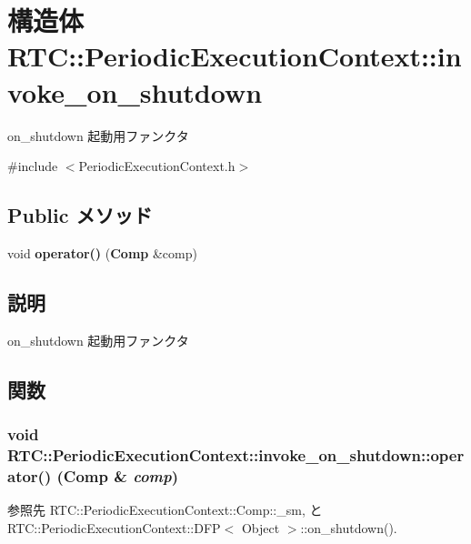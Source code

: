 \section{構造体 RTC::PeriodicExecutionContext::invoke\_\-on\_\-shutdown}
\label{structRTC_1_1PeriodicExecutionContext_1_1invoke__on__shutdown}


on\_\-shutdown 起動用ファンクタ  




{\ttfamily \#include $<$PeriodicExecutionContext.h$>$}

\subsection*{Public メソッド}
\begin{DoxyCompactItemize}
\item 
void {\bf operator()} ({\bf Comp} \&comp)
\end{DoxyCompactItemize}


\subsection{説明}
on\_\-shutdown 起動用ファンクタ 

\subsection{関数}
\subsubsection[{operator()}]{\setlength{\rightskip}{0pt plus 5cm}void RTC::PeriodicExecutionContext::invoke\_\-on\_\-shutdown::operator() ({\bf Comp} \& {\em comp})\hspace{0.3cm}{\ttfamily  [inline]}}\label{structRTC_1_1PeriodicExecutionContext_1_1invoke__on__shutdown_a4da104c45a5f714bcfe37ec50055305a}


参照先 RTC::PeriodicExecutionContext::Comp::\_\-sm, と RTC::PeriodicExecutionContext::DFP$<$ Object $>$::on\_\-shutdown().

